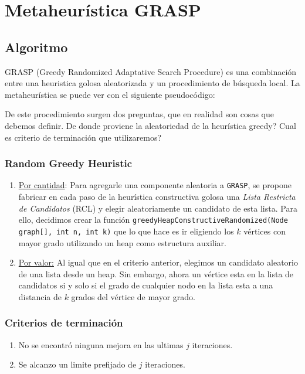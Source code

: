 \section{Metaheurística GRASP}

\subsection{Algoritmo}

GRASP (Greedy Randomized Adaptative Search Procedure) es una combinación entre una heuristica golosa aleatorizada y un procedimiento de búsqueda local. La metaheurística se puede ver con el siguiente pseudocódigo:

\begin{algorithmic}
	\EndIf
\EndWhile
\EndProcedure
\end{algorithmic}

De este procedimiento surgen dos preguntas, que en realidad son cosas que debemos definir. De donde proviene la aleatoriedad de la heurística greedy? Cual es criterio de terminación que utilizaremos?

\subsubsection{Random Greedy Heuristic}

\begin{enumerate}
\item \underline{Por cantidad}:
Para agregarle una componente aleatoria a \texttt{GRASP}, se propone fabricar en cada paso de la heurística constructiva golosa una \textit{Lista Restricta de Candidatos} (RCL) y elegir aleatoriamente un candidato de esta lista. Para ello, decidimos crear la función \texttt{greedyHeapConstructiveRandomized(Node graph[], int n, int k)} que lo que hace es ir eligiendo los $k$ vértices con mayor grado utilizando un heap como estructura auxiliar.
\item \underline{Por valor:} Al igual que en el criterio anterior, elegimos un candidato aleatorio de una lista desde un heap. Sin embargo, ahora un vértice esta en la lista de candidatos si y solo si el grado de cualquier nodo en la lista esta a una distancia de $k$ grados del vértice de mayor grado.
\end{enumerate}

\subsubsection{Criterios de terminación}
\begin{enumerate}
\item No se encontró ninguna mejora en las ultimas $j$ iteraciones.
\item Se alcanzo un limite prefijado de  $j$ iteraciones.
\end{enumerate}